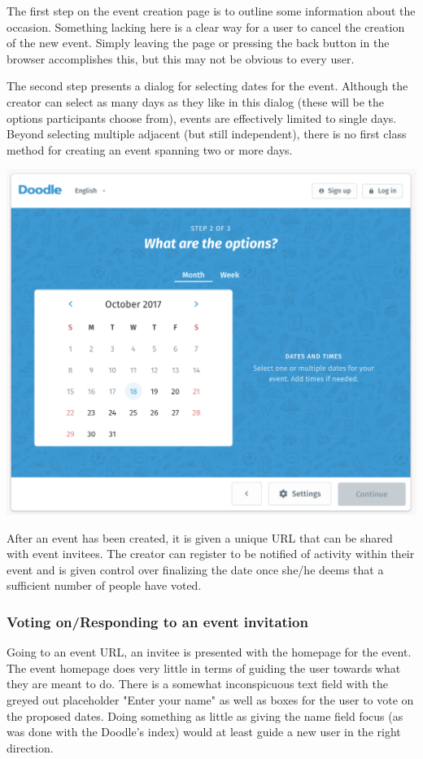 \documentclass{sigchi}
\begin{document}
The first step on the event creation page is to outline some
information about the occasion. Something lacking here is a clear
way for a user to cancel the creation of the new event. Simply
leaving the page or pressing the back button in the browser
accomplishes this, but this may not be obvious to every user.

The second step presents a dialog for selecting dates for the
event. Although the creator can select as many days as they like in
this dialog (these will be the options participants choose from),
events are effectively limited to single days. Beyond selecting
multiple adjacent (but still independent), there is no first class
method for creating an event spanning two or more days. 

\includegraphics[width=\columnwidth]{doodle/create-2.png}

After an event has been created, it is given a unique URL that can
be shared with event invitees. The creator can register to be
notified of activity within their event and is given control over
finalizing the date once she/he deems that a sufficient number of
people have voted.

\subsubsection{Voting on/Responding to an event invitation}

Going to an event URL, an invitee is presented with the homepage for
the event. The event homepage does very little in terms of guiding
the user towards what they are meant to do. There is a somewhat
inconspicuous text field with the greyed out placeholder "Enter your
name" as well as boxes for the user to vote on the proposed
dates. Doing something as little as giving the name field focus (as
was done with the Doodle's index) would at least guide a new user in
the right direction.
\end{document}
